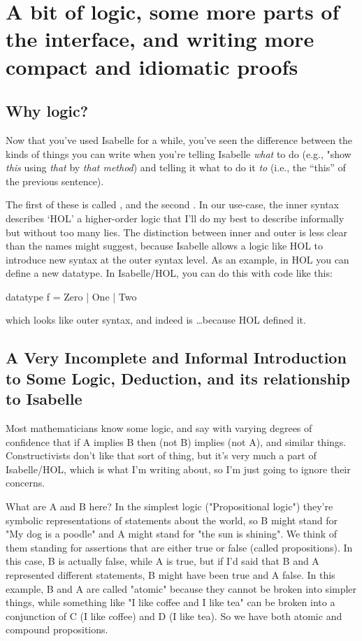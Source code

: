 \chapter{A bit  of logic, some more parts of the interface, and writing more compact and idiomatic proofs}

\section{Why logic?}
Now that you've used Isabelle for a while, you've seen the difference between the kinds of things you can write when you're telling Isabelle \textit{what} to do (e.g., "show \textit{this} using \textit{that} by \textit{that method}) and telling it what to do it \textit{to} (i.e., the ``this'' of the previous sentence).  

The first of these is called , and the second . In our use-case, the inner syntax describes `HOL' a higher-order logic that I'll do my best to describe informally but without too many lies. The distinction between inner and outer is less clear than the names might suggest, because Isabelle allows a logic like HOL to introduce new syntax at the outer syntax level. As an example, in HOL you can define a new datatype. In Isabelle/HOL, you can do this with code like this:
\begin{IS}
datatype f = Zero | One | Two
\end{IS}
which looks like outer syntax, and indeed is \ldots because HOL defined it. 



\section{
A Very Incomplete and Informal Introduction to Some Logic, Deduction, and its relationship to Isabelle}
Most mathematicians know some logic, and say with varying degrees of confidence that if A implies B then (not B) implies (not A), and similar things. Constructivists don't like that sort of thing, but it's very much a part of Isabelle/HOL, which is what I'm writing about, so I'm just going to ignore their concerns. 

What are A and B here? In the simplest logic ("Propositional logic") they're symbolic representations of statements about the world, so B might stand for "My dog is a poodle" and A might stand for "the sun is shining". We think of them standing for assertions that are either true or false (called propositions). In this case, B is actually false, while A is true, but if I'd said that B and A represented different statements, B might have been true and A false. In this example, B and A are called "atomic" because they cannot be broken into simpler things, while something like "I like coffee and I like tea" can be broken into a conjunction of C (I like coffee) and D (I like tea). So we have both atomic and compound propositions. 

